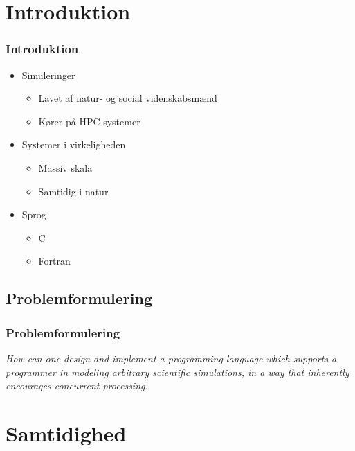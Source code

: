 \section{Introduktion}
\begin{frame}
  \frametitle{Introduktion}
  \begin{itemize}
    \item Simuleringer
    \begin{itemize}
      \item Lavet af natur- og social videnskabsmænd
      \item Kører på HPC systemer
    \end{itemize}
    \item Systemer i virkeligheden
    \begin{itemize}
      \item Massiv skala
      \item Samtidig i natur
    \end{itemize}
    \item Sprog
    \begin{itemize}
      \item C
      \item Fortran
    \end{itemize}
  \end{itemize}
\end{frame}

\subsection{Problemformulering}
\begin{frame}
  \frametitle{Problemformulering}
  \emph{How can one design and implement a programming language which supports a
programmer in modeling arbitrary scientific simulations, in a way that inherently
encourages concurrent processing.}
\end{frame}

\section{Samtidighed}
